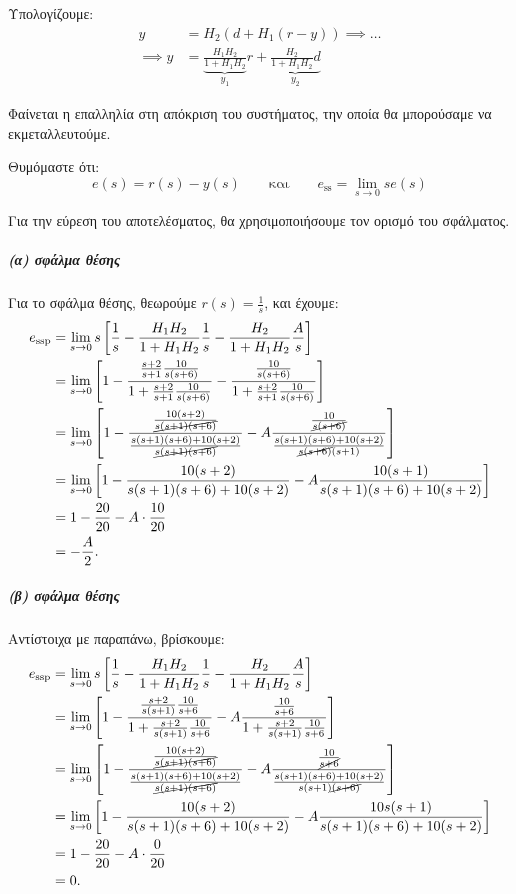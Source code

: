 \documentclass[11pt,a4paper,notitlepage,fleqn,final]{article}
\begin{document}
\begin{exercise}
Υπολογίζουμε:
\begin{align*}
	y &= H_2\left( d+H_1(r-y) \right) \implies \dots \\
	\implies y &= \underbrace{\frac{H_1H_2}{1+H_1H_2}}_{y_1} r +
	\underbrace{\frac{H_2}{1+H_1H_2}d}_{y_2}
\end{align*}

Φαίνεται η επαλληλία στη απόκριση του συστήματος, την οποία θα μπορούσαμε να εκμεταλλευτούμε.

Θυμόμαστε ότι:
\[
e(s) = r(s)-y(s) \qquad \text{και} \qquad
e_{\mathrm{ss}} = \lim_{s\to 0} se(s)
\]

Για την εύρεση του αποτελέσματος, θα χρησιμοποιήσουμε τον ορισμό του σφάλματος.

\subparagraph{(α) σφάλμα θέσης}
Για το σφάλμα θέσης, θεωρούμε \( r(s) = \frac{1}{s} \),  και έχουμε:
\begin{align*}
	e_{\mathrm{ssp}} &= \lim_{s\to 0}s\left[
	\frac{1}{s} - \frac{H_1H_2}{1+H_1H_2} \frac{1}{s}
	- \frac{H_2}{1+H_1H_2}\frac{A}{s}
	\right]
	\\ &=
	\lim_{s\to 0} \left[
	1 - \frac{\frac{s+2}{s+1}\frac{10}{s(s+6)}}{1+\frac{s+2}{s+1}\frac{10}{s(s+6)}}
	- \frac{\frac{10}{s(s+6)}}{1+\frac{s+2}{s+1}\frac{10}{s(s+6)}}
	\right]
	\\ &= \lim_{s\to 0} \left[
	1-\frac{\frac{10(s+2)}{\cancel{s(s+1)(s+6)}}}{\frac{s(s+1)(s+6)+10(s+2)}{\cancel{s(s+1)(s+6)}}} - A
	\frac{\frac{10}{\cancel{s(s+6)}}}{\frac{s(s+1)(s+6)+10(s+2)}{\cancel{s(s+6)}(s+1)}}
	\right]
	\\ &= \lim_{s\to 0} \left[
	1- \frac{10(s+2)}{s(s+1)(s+6)+10(s+2)}
	-A\frac{10(s+1)}{s(s+1)(s+6)+10(s+2)}
	\right]
	\\ &= 1 - \frac{20}{20} - A\cdot\frac{10}{20}
	\\ &= -\frac{A}{2}.
\end{align*}
\subparagraph{(β) σφάλμα θέσης}
Αντίστοιχα με παραπάνω, βρίσκουμε:
\begin{align*}
    e_{\mathrm{ssp}} &= \lim_{s\to 0}s\left[
    \frac{1}{s} - \frac{H_1H_2}{1+H_1H_2} \frac{1}{s}
    - \frac{H_2}{1+H_1H_2}\frac{A}{s}
    \right]
    \\ &=
    \lim_{s\to 0} \left[
    1 - \frac{\frac{s+2}{s(s+1)}\frac{10}{s+6}}{1+\frac{s+2}{s(s+1)}\frac{10}{s+6}}
    - A\frac{\frac{10}{s+6}}{1+\frac{s+2}{s(s+1)}\frac{10}{s+6}}
    \right]
    \\ &=
    \lim_{s\to 0} \left[
    1-
    \frac{\frac{10(s+2)}{\cancel{s(s+1)(s+6)}}}{\frac{s(s+1)(s+6)+10(s+2)}{\cancel{s(s+1)(s+6)}}}
    - A\frac{\frac{10}{\cancel{s+6}}}{
    	\frac{s(s+1)(s+6)+10(s+2)}{s(s+1)\cancel{(s+6)}}
    	}
    \right]
    \\ &=
    \lim_{s\to 0} \left[
    1 - \frac{10(s+2)}{s(s+1)(s+6)+10(s+2)}
    - A \frac{10s(s+1)}{s(s+1)(s+6)+10(s+2)}
    \right]
    \\ &= 1 - \frac{20}{20} - A\cdot \frac{0}{20}
    \\ &= 0.
\end{align*}


\end{exercise}
\end{document}

